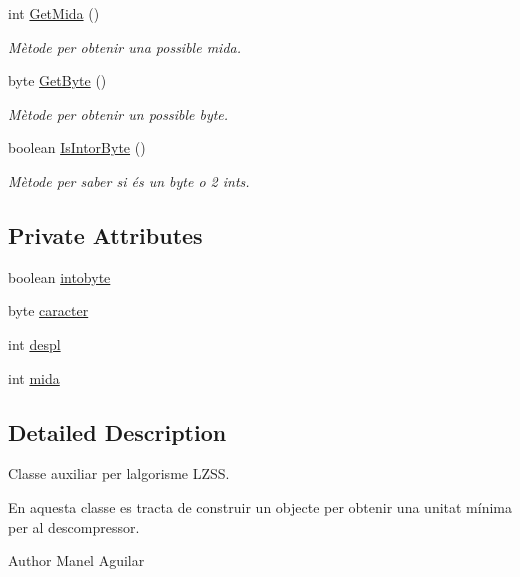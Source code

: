 \begin{DoxyCompactItemize}
int \hyperlink{classdomini_1_1utils_1_1IntorByte_abccf2f9cda2f62acdf0c1342f9acdead}{Get\+Mida} ()
\begin{DoxyCompactList}\small\item\em Mètode per obtenir una possible mida. \end{DoxyCompactList}\item 
byte \hyperlink{classdomini_1_1utils_1_1IntorByte_afd907b7001011bbca374605fb11491f4}{Get\+Byte} ()
\begin{DoxyCompactList}\small\item\em Mètode per obtenir un possible byte. \end{DoxyCompactList}\item 
boolean \hyperlink{classdomini_1_1utils_1_1IntorByte_a4fcfaf967d0c82b8147d632da4e238d0}{Is\+Intor\+Byte} ()
\begin{DoxyCompactList}\small\item\em Mètode per saber si és un byte o 2 int\textquotesingle{}s. \end{DoxyCompactList}\end{DoxyCompactItemize}
\subsection*{Private Attributes}
\begin{DoxyCompactItemize}
\item 
boolean \hyperlink{classdomini_1_1utils_1_1IntorByte_aee013881ecae778d25cab7c0b7655528}{intobyte}
\item 
byte \hyperlink{classdomini_1_1utils_1_1IntorByte_adbb2e8c31ead2f27d85ff39683b9a8a7}{caracter}
\item 
int \hyperlink{classdomini_1_1utils_1_1IntorByte_a83872b8acc9ab187acbc2175d5bf320e}{despl}
\item 
int \hyperlink{classdomini_1_1utils_1_1IntorByte_a6dd2ad21efcfb2bcfff716f5e04794d9}{mida}
\end{DoxyCompactItemize}


\subsection{Detailed Description}
Classe auxiliar per l\textquotesingle{}algorisme L\+Z\+SS. 

En aquesta classe es tracta de construir un objecte per obtenir una unitat mínima per al descompressor.

\begin{DoxyAuthor}{Author}
Manel Aguilar 
\end{DoxyAuthor}


